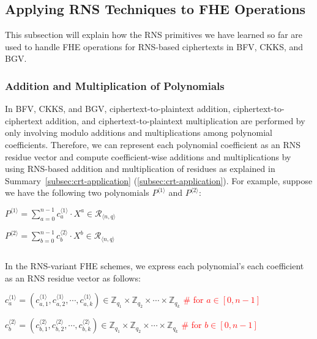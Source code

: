 \subsection{Applying RNS Techniques to FHE Operations}
\label{subsec:rns-application}

This subsection will explain how the RNS primitives we have learned so far are used to handle FHE operations for RNS-based ciphertexts in BFV, CKKS, and BGV. 


\subsubsection{Addition and Multiplication of Polynomials}
\label{subsubsec:rns-application-basic}

In BFV, CKKS, and BGV, ciphertext-to-plaintext addition, ciphertext-to-ciphertext addition, and ciphertext-to-plaintext multiplication are performed by only involving modulo additions and multiplications among polynomial coefficients. Therefore, we can represent each polynomial coefficient as an RNS residue vector and compute coefficient-wise additions and multiplications by using RNS-based addition and multiplication of residues as explained in Summary~\ref*{subsec:crt-application} (\autoref{subsec:crt-application}). For example, suppose we have the following two polynomials $P^{\langle 1 \rangle}$ and $P^{\langle 2 \rangle}$:

$P^{\langle 1 \rangle} = \sum\limits_{a=0}^{n-1} c^{\langle 1 \rangle}_a \cdot X^a \in \mathcal{R}_{\langle n, q\rangle}$

$P^{\langle 2 \rangle} = \sum\limits_{b=0}^{n-1} c^{\langle 2 \rangle}_b \cdot X^b \in \mathcal{R}_{\langle n, q\rangle}$

$ $

In the RNS-variant FHE schemes, we express each polynomial's each coefficient as an RNS residue vector as follows:

$c^{\langle 1 \rangle}_a = (c^{\langle 1 \rangle}_{a,1}, c^{\langle 1 \rangle}_{a,2}, \cdots, c^{\langle 1 \rangle}_{a,k}) \in \mathbb{Z}_{q_1} \times \mathbb{Z}_{q_2} \times \cdots \times \mathbb{Z}_{q_k}$ \textcolor{red}{ \# for $a \in [0, n - 1]$}

$c^{\langle 2 \rangle}_b = (c^{\langle 2 \rangle}_{b,1}, c^{\langle 2 \rangle}_{b,2}, \cdots, c^{\langle 2 \rangle}_{b,k}) \in \mathbb{Z}_{q_1} \times \mathbb{Z}_{q_2} \times \cdots \times \mathbb{Z}_{q_k}$ \textcolor{red}{ \# for $b \in [0, n - 1]$}

$ $


